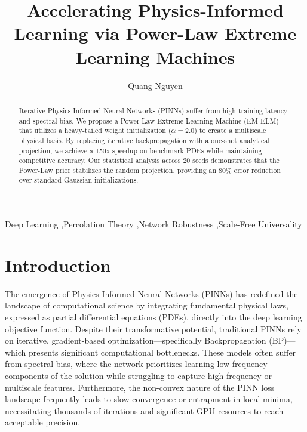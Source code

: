 \documentclass[final,12pt,3p,times,fleqn]{elsarticle}
\begin{document}
\begin{frontmatter}

\title{Accelerating Physics-Informed Learning via Power-Law Extreme Learning Machines}

\author[1,2]{Quang Nguyen}

\address[1]{Department of Physics, International University, Ho Chi Minh City, Vietnam}
\address[2]{Viet Nam National University Ho Chi Minh City, Vietnam}


\begin{abstract}
Iterative Physics-Informed Neural Networks (PINNs) suffer from high training latency and spectral bias. We propose a Power-Law Extreme Learning Machine (EM-ELM) that utilizes a heavy-tailed weight initialization ($\alpha=2.0$) to create a multiscale physical basis. By replacing iterative backpropagation with a one-shot analytical projection, we achieve a 150x speedup on benchmark PDEs while maintaining competitive accuracy. Our statistical analysis across 20 seeds demonstrates that the Power-Law prior stabilizes the random projection, providing an $80\%$ error reduction over standard Gaussian initializations.
\end{abstract}

\begin{keyword}
Deep Learning \sep Percolation Theory \sep Network Robustness \sep Scale-Free Universality
\end{keyword}

\end{frontmatter}

\section{Introduction}

The emergence of Physics-Informed Neural Networks (PINNs) has redefined the landscape of computational science by integrating fundamental physical laws, expressed as partial differential equations (PDEs), directly into the deep learning objective function. Despite their transformative potential, traditional PINNs rely on iterative, gradient-based optimization---specifically Backpropagation (BP)---which presents significant computational bottlenecks. These models often suffer from spectral bias, where the network prioritizes learning low-frequency components of the solution while struggling to capture high-frequency or multiscale features. Furthermore, the non-convex nature of the PINN loss landscape frequently leads to slow convergence or entrapment in local minima, necessitating thousands of iterations and significant GPU resources to reach acceptable precision.
\end{document}
